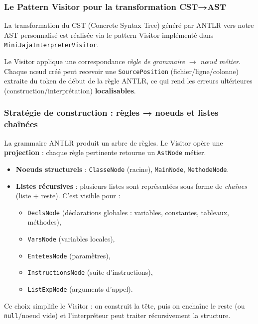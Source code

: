\subsubsection{Le Pattern Visitor pour la transformation CST→AST}

La transformation du CST (Concrete Syntax Tree) généré par ANTLR vers notre AST personnalisé est réalisée via le pattern Visitor implémenté dans \texttt{MiniJajaInterpreterVisitor}.

Le Visitor applique une correspondance \emph{règle de grammaire} $\rightarrow$ \emph{nœud métier}. Chaque nœud créé peut recevoir une \texttt{SourcePosition} (fichier/ligne/colonne) extraite du token de début de la règle ANTLR, ce qui rend les erreurs ultérieures (construction/interprétation) \textbf{localisables}.

\subsubsection{Stratégie de construction : règles → noeuds et listes chaînées}

La grammaire ANTLR produit un arbre de règles. Le Visitor opère une \textbf{projection} : chaque règle pertinente retourne un \texttt{AstNode} métier.

\begin{itemize}
    \item \textbf{Noeuds structurels} : \texttt{ClasseNode} (racine), \texttt{MainNode}, \texttt{MethodeNode}.
    \item \textbf{Listes récursives} : plusieurs listes sont représentées sous forme de \emph{chaînes} (liste + reste). C'est visible pour :
    \begin{itemize}
        \item \texttt{DeclsNode} (déclarations globales : variables, constantes, tableaux, méthodes),
        \item \texttt{VarsNode} (variables locales),
        \item \texttt{EntetesNode} (paramètres),
        \item \texttt{InstructionsNode} (suite d'instructions),
        \item \texttt{ListExpNode} (arguments d'appel).
    \end{itemize}
\end{itemize}

Ce choix simplifie le Visitor : on construit la tête, puis on enchaîne le reste (ou \texttt{null}/noeud vide) et l'interpréteur peut traiter récursivement la structure.


